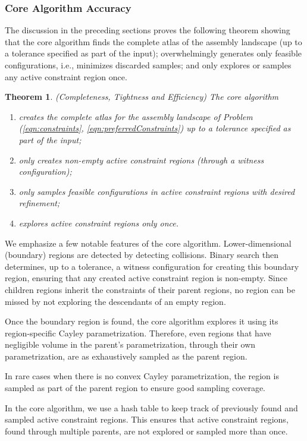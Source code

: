 \documentclass[]{article}
\newtheorem{theorem}{Theorem}[section]
\newcommand{\ctwo}{\ref{eqn:preferredConstraints}}
\newcommand{\cone}{\ref{eqn:constraints}}
\begin{document}
\subsubsection{Core Algorithm Accuracy}
\label{sec:results:CompletenessAnalysis}
The discussion in the preceding sections proves the following theorem showing
that the core algorithm finds the complete atlas of the assembly landscape (up
to a tolerance specified as part of the input); overwhelmingly generates only
feasible configurations, i.e., minimizes discarded samples; and only explores or
samples any active constraint region once.


\begin{theorem}{(Completeness, Tightness and Efficiency)}
\label{thm:completeness}
The core algorithm 
\begin{enumerate}
	\item creates the complete atlas for the assembly landscape of Problem (\cone, \ctwo) up to a tolerance 
specified as part of the input;
	\item only creates non-empty active constraint regions (through a witness configuration);
	\item only samples feasible configurations in active constraint regions with desired refinement;
    \item explores active constraint regions only once.
\end{enumerate}
\end{theorem}

We emphasize a few notable features of the core algorithm.  Lower-dimensional
(boundary) regions are detected by detecting collisions.  Binary search then
determines, up to a tolerance, a witness configuration for creating this
boundary region, ensuring that any created active constraint region is
non-empty.  Since children regions inherit the constraints of their parent
regions, no region can be missed by not exploring the descendants of an empty
region.

Once the boundary region is found, the core algorithm explores it using its
region-specific Cayley parametrization. Therefore, even regions that have
negligible volume in the parent's parametrization, through their own
parametrization, are as exhaustively sampled as the parent region.

In rare cases when there is no convex Cayley parametrization, the region is
sampled as part of the parent region to ensure good sampling coverage. 

In the core algorithm, we use a hash table to keep track of previously found
and sampled active constraint regions. This ensures that active constraint
regions, found through multiple parents, are not explored or sampled more than
once.
\end{document}
